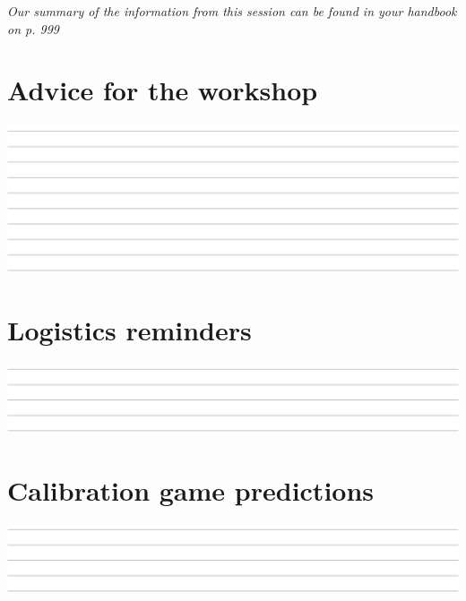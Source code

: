 \setlength{\parindent}{0em}
\emph{Our summary of the information from this session can be found in your handbook on p. 999}

\section*{Advice for the workshop}
\includegraphics[width=\textwidth]{../../../img/linesquarter.png}

\section*{Logistics reminders}
\includegraphics[width=\textwidth]{../../../img/lineseighth.png}

\section*{Calibration game predictions}
\includegraphics[width=\textwidth]{../../../img/lineseighth.png}



